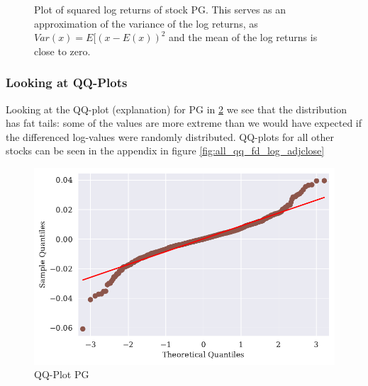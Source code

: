 \begin{figure}[h]
    \centering
    \begin{adjustbox}{width=.9\textwidth,center}
    
    \end{adjustbox}  
    \caption{Plot of squared log returns of stock PG. This serves as an approximation of the variance of the log returns, as $Var(x) = E [(x - E(x))^2$ and the mean of the log returns is close to zero.}
    \label{fig:PG_squared_log_returns}
\end{figure}{}



\subsubsection*{Looking at QQ-Plots}
Looking at the QQ-plot (explanation) for PG in \ref{fig:PG_qq_fd_log_adjclose} we see that the distribution has fat tails: some of the values are more extreme than we would have expected if the differenced log-values were randomly distributed. QQ-plots for all other stocks can be seen in the appendix in figure \ref{fig:all_qq_fd_log_adjclose}

\begin{figure}[h]
    \centering
    \begin{adjustbox}{width=.9\textwidth,center}
    \includegraphics[]{figures/PG_log_adjclose_fd_and_qq.pdf}
    \end{adjustbox}  
    \caption{QQ-Plot PG}
    \label{fig:PG_qq_fd_log_adjclose}
\end{figure}{}
